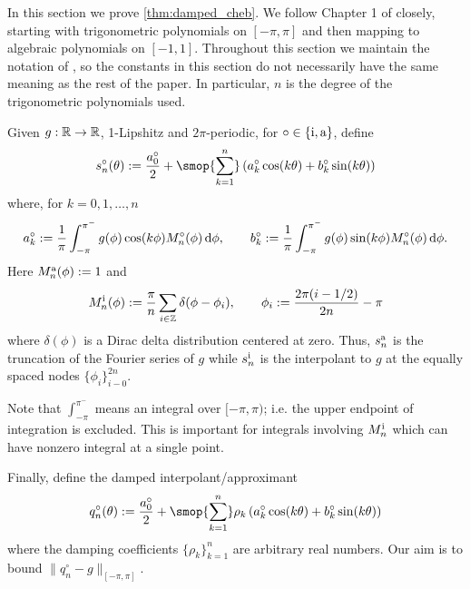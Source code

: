 
In this section we prove \cref{thm:damped_cheb}.
We follow Chapter 1 of \cite{rivlin_81} closely, starting with trigonometric polynomials on \( [-\pi,\pi] \) and then mapping to algebraic polynomials on \( [-1,1] \).
Throughout this section we maintain the notation of \cite{rivlin_81}, so the constants in this section do not necessarily have the same meaning as the rest of the paper.
In particular, \( n \) is the degree of the trigonometric polynomials used.



Given \( g:\mathbb{R}\to\mathbb{R} \), 1-Lipshitz and \( 2\pi \)-periodic, for \( \circ \in \{ \textup{i}, \textup{a} \} \), define
\begin{equation*}
    s_n^\circ(\theta) 
    := \frac{a_0^\circ}{2} 
    + \smop{\sum_{k=1}^{n}} \left( a_k^\circ \cos(k\theta) + b_k^\circ \sin(k\theta) \right)
\end{equation*}
where, for \( k=0,1,\ldots, n \)
\begin{equation*}
    a_k^\circ := \frac{1}{\pi}\int_{-\pi}^{\pi^-} g(\phi) \cos(k\phi) M_n^\circ(\phi) \,\textup{d}\phi
    ,\qquad
    b_k^\circ := \frac{1}{\pi}\int_{-\pi}^{\pi^-} g(\phi) \sin(k\phi) M_n^\circ(\phi) \,\textup{d}\phi.
\end{equation*}
Here \( M_n^{\textup{a}}(\phi) := 1 \) and 
\begin{equation*}
    M_n^{\textup{i}}(\phi) 
    :=  \frac{\pi}{n} \sum_{i\in\mathbb{Z}}\delta(\phi-\phi_i)
    ,\qquad 
    \phi_i 
    := \frac{2\pi(i-1/2)}{2n} - \pi
\end{equation*}
where \( \delta(\phi) \) is a Dirac delta distribution centered at zero.
Thus, \( s_n^\textup{a} \) is the truncation of the Fourier series of \( g \) while \( s_n^{\textup{i}} \) is the interpolant to \( g \) at the equally spaced nodes \( \{ \phi_i \}_{i-0}^{2n} \).

\begin{remark}
    Note that \( \int_{-\pi}^{\pi^-} \) means an integral over \( [-\pi,\pi) \); i.e. the upper endpoint of integration is excluded. 
    This is important for integrals involving \( M_n^{\textup{i}} \) which can have nonzero integral at a single point.
\end{remark}


Finally, define the damped interpolant/approximant
\begin{equation*}
    q_n^\circ(\theta) 
    := \frac{a^\circ_0}{2} + \smop{\sum_{k=1}^{n}} \rho_k \left( a_k^\circ \cos(k \theta) + b_k^\circ \sin(k\theta) \right)
\end{equation*}
where the damping coefficients \( \{ \rho_{k} \}_{k=1}^{n} \) are arbitrary real numbers.
Our aim is to bound \( \| q_n^\circ - g \|_{[-\pi,\pi]} \).

